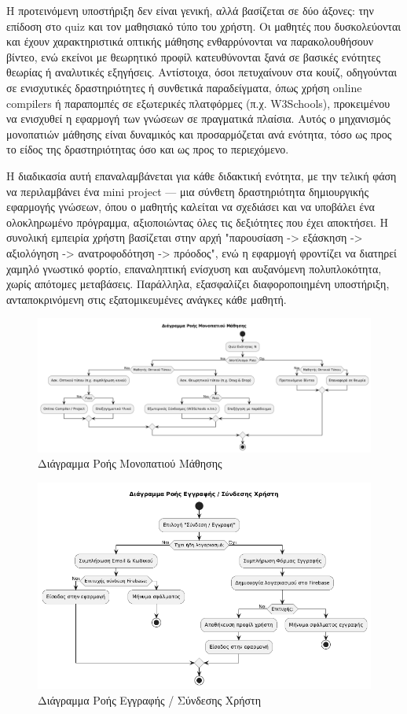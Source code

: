 \documentclass[11pt]{report}
\begin{document}
Η προτεινόμενη υποστήριξη δεν είναι γενική, αλλά βασίζεται σε δύο άξονες: την επίδοση στο quiz και τον μαθησιακό τύπο του χρήστη. Οι μαθητές που δυσκολεύονται και έχουν χαρακτηριστικά οπτικής μάθησης ενθαρρύνονται να παρακολουθήσουν βίντεο, ενώ εκείνοι με θεωρητικό προφίλ κατευθύνονται ξανά σε βασικές ενότητες θεωρίας ή αναλυτικές εξηγήσεις. Αντίστοιχα, όσοι πετυχαίνουν στα κουίζ, οδηγούνται σε ενισχυτικές δραστηριότητες ή συνθετικά παραδείγματα, όπως χρήση online compilers ή παραπομπές σε εξωτερικές πλατφόρμες (π.χ. W3Schools), προκειμένου να ενισχυθεί η εφαρμογή των γνώσεων σε πραγματικά πλαίσια. Αυτός ο μηχανισμός μονοπατιών μάθησης είναι δυναμικός και προσαρμόζεται ανά ενότητα, τόσο ως προς το είδος της δραστηριότητας όσο και ως προς το περιεχόμενο. 

Η διαδικασία αυτή επαναλαμβάνεται για κάθε διδακτική ενότητα, με την τελική φάση να περιλαμβάνει ένα mini project — μια σύνθετη δραστηριότητα δημιουργικής εφαρμογής γνώσεων, όπου ο μαθητής καλείται να σχεδιάσει και να υποβάλει ένα ολοκληρωμένο πρόγραμμα, αξιοποιώντας όλες τις δεξιότητες που έχει αποκτήσει. Η συνολική εμπειρία χρήστη βασίζεται στην αρχή "παρουσίαση -> εξάσκηση -> αξιολόγηση -> ανατροφοδότηση -> πρόοδος", ενώ η εφαρμογή φροντίζει να διατηρεί χαμηλό γνωστικό φορτίο, επαναληπτική ενίσχυση και αυξανόμενη πολυπλοκότητα, χωρίς απότομες μεταβάσεις. Παράλληλα, εξασφαλίζει διαφοροποιημένη υποστήριξη, ανταποκρινόμενη στις εξατομικευμένες ανάγκες κάθε μαθητή. 

\begin{figure}[H]
    \centering
    \includegraphics[width=0.9\linewidth]{Figures/image001.png}
    \caption{Διάγραμμα Ροής Μονοπατιού Μάθησης}
    \label{fig:learning-flow}
\end{figure}

\begin{figure}[H]
    \centering
    \includegraphics[width=0.9\linewidth]{Figures/image002.png}
    \caption{Διάγραμμα Ροής Εγγραφής / Σύνδεσης Χρήστη}
    \label{fig:signup-flow}
\end{figure}
\end{document}
